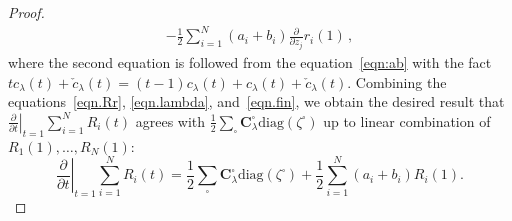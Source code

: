 \documentclass[12pt,reqno]{amsart}
\theoremstyle{definition}
\def\diag{\mathrm{diag}}
\begin{document}
\begin{proof}
\begin{align}
  - \frac{1}{2} \sum_{i=1}^N (a_i+b_i) \frac{\partial}{\partial z_j}r_i(1) \,,
  \label{eqn.fin}
\end{align}
where the second equation is followed from the equation~\eqref{eqn:ab} with the
fact $t c_\lambda(t)+\check{c}_\lambda(t)=(t-1)c_\lambda(t)
+ c_\lambda(t)+\check{c}_\lambda(t)$. Combining the equations~\eqref{eqn.Rr},
\eqref{eqn.lambda}, and~\eqref{eqn.fin}, we obtain the desired result that
$\left.\frac{\partial}{\partial t}\right |_{t=1} \sum_{i=1}^N R_i(t)$ agrees with
$\frac{1}{2}\sum_\square \mathbf{C}_\lambda^\square  \diag(\zeta^\square)$ up to linear
combination of $R_1(1),\ldots, R_{N}(1)$:
\[
  \left. \frac{\partial}{\partial t} \right|_{t=1} \sum_{i=1}^N R_i(t)
  = \frac{1}{2}\sum_\square \mathbf{C}_\lambda^\square  \diag(\zeta^\square)
  + \frac{1}{2} \sum_{i=1}^N (a_i+b_i) R_i(1)  .
\]
\end{proof}
\end{document}
